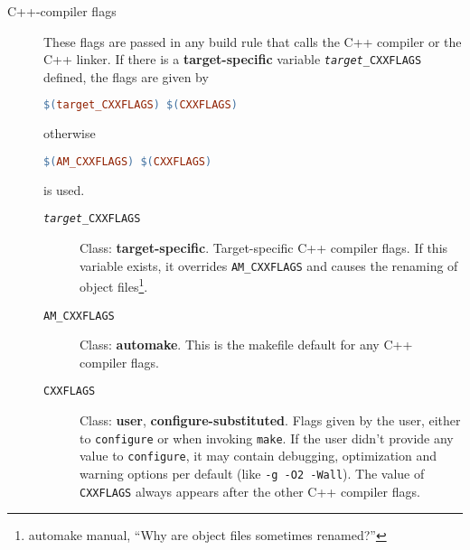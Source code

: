 \documentclass[11pt,a4paper,headinclude,footinclude,DIV16,normalheadings]{scrartcl}
\begin{document}
\begin{description}
\item[C++-compiler flags] These flags are passed in any build rule that calls
  the C++ compiler or the C++ linker.  If there is a {\bf target-specific}
  variable \texttt{\textit{target}\_CXXFLAGS} defined, the flags are given by
\begin{lstlisting}[language=make]
$(target_CXXFLAGS) $(CXXFLAGS)
\end{lstlisting}
  otherwise
\begin{lstlisting}[language=make]
$(AM_CXXFLAGS) $(CXXFLAGS)
\end{lstlisting}
  is used.
  \begin{description}
  \item[\texttt{\textit{target}\_CXXFLAGS}] Class: {\bf target-specific}.
    Target-specific C++ compiler flags.  If this variable exists, it overrides
    \texttt{AM\_CXXFLAGS} and causes the renaming of object
    files\footnote{automake manual, ``Why are object files sometimes
      renamed?''}.
  \item[\texttt{AM\_CXXFLAGS}] Class: {\bf automake}.  This is the makefile
    default for any C++ compiler flags.
  \item[\texttt{CXXFLAGS}] Class: {\bf user}, {\bf configure-substituted}.
    Flags given by the user, either to \texttt{configure} or when invoking
    \texttt{make}.  If the user didn't provide any value to
    \texttt{configure}, it may contain debugging, optimization and warning
    options per default (like \texttt{-g -O2 -Wall}).  The value of
    \texttt{CXXFLAGS} always appears after the other C++ compiler flags.
  \end{description}


\end{description}
\end{document}
